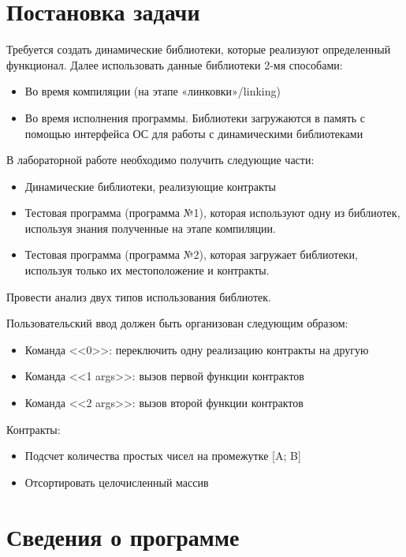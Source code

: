 \documentclass[pdf, unicode, 12pt, a4paper,oneside,fleqn]{article}
\begin{document}
\section{Постановка задачи}

Требуется создать динамические библиотеки, которые реализуют определенный функционал. 
Далее использовать данные библиотеки 2-мя способами:

\begin{itemize}
    \item Во время компиляции (на этапе «линковки»/linking)
    \item Во время исполнения программы. Библиотеки загружаются в память с помощью 
            интерфейса ОС для работы с динамическими библиотеками
\end{itemize}

В лабораторной работе необходимо получить следующие части:

\begin{itemize}
    \item Динамические библиотеки, реализующие контракты
    \item Тестовая программа (программа №1), которая используют одну из библиотек, используя 
    знания полученные на этапе компиляции.
    \item Тестовая программа (программа №2), которая загружает библиотеки, используя только их 
    местоположение и контракты.
\end{itemize}

Провести анализ двух типов использования библиотек.

Пользовательский ввод должен быть организован следующим образом:

\begin{itemize}
    \item Команда <<0>>: переключить одну реализацию контракты на другую
    \item Команда <<1 args>>: вызов первой функции контрактов
    \item Команда <<2 args>>: вызов второй функции контрактов
\end{itemize}

Контракты:
\begin{itemize}
    \item Подсчет количества простых чисел на промежутке [A; B]
    \item Отсортировать целочисленный массив
\end{itemize}

\section{Сведения о программе}
\end{document}
